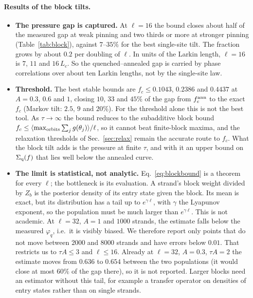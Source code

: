 \documentclass[10pt,a4paper]{article}
\newcommand{\Sq}{\Sigma_{\rm q}}
\begin{document}
\paragraph{Results of the block tilts.}
\begin{itemize}
\item \textbf{The pressure gap is captured.} At $\ell=16$ the bound closes about half of the measured gap at weak pinning and two thirds or more at stronger pinning (Table~\ref{tab:block}), against $7$--$35\%$ for the best single-site tilt. The fraction grows by about $0.2$ per doubling of $\ell$. In units of the Larkin length, $\ell=16$ is $7$, $11$ and $16\,L_c$. So the quenched--annealed gap is carried by phase correlations over about ten Larkin lengths, not by the single-site law.
\item \textbf{Threshold.} The best stable bounds are $f_c\le0.1043$, $0.2386$ and $0.4437$ at $A=0.3$, $0.6$ and $1$, closing $10$, $33$ and $45\%$ of the gap from $f_c^{\rm ann}$ to the exact $f_c$ (Markov tilt: $2.5$, $9$ and $20\%$). For the threshold alone this is not the best tool. As $\tau\to\infty$ the bound reduces to the subadditive block bound $f_c\le\langle\max_{\rm orbits}\sum_jg(\theta_j)\rangle/\ell$, so it cannot beat finite-block maxima, and the relaxation thresholds of Sec.~\ref{sec:relax} remain the accurate route to $f_c$. What the block tilt adds is the pressure at finite $\tau$, and with it an upper bound on $\Sq(f)$ that lies well below the annealed curve.
\item \textbf{The limit is statistical, not analytic.} Eq.~\eqref{eq:blockbound} is a theorem for every $\ell$; the bottleneck is its evaluation. A strand's block weight divided by $Z_b$ is the posterior density of its entry state given the block. Its mean is exact, but its distribution has a tail up to $e^{\gamma\ell}$, with $\gamma$ the Lyapunov exponent, so the population must be much larger than $e^{\gamma\ell}$. This is not academic. At $\ell=32$, $A=1$ and $1000$ strands, the estimate falls below the measured $\varphi_q$, i.e.\ it is visibly biased. We therefore report only points that do not move between $2000$ and $8000$ strands and have errors below $0.01$. That restricts us to $\tau A\le3$ and $\ell\le16$. Already at $\ell=32$, $A=0.3$, $\tau A=2$ the estimate moves from $0.636$ to $0.654$ between the two populations (it would close at most $60\%$ of the gap there), so it is not reported. Larger blocks need an estimator without this tail, for example a transfer operator on densities of entry states rather than on single strands.
\end{itemize}
\end{document}
